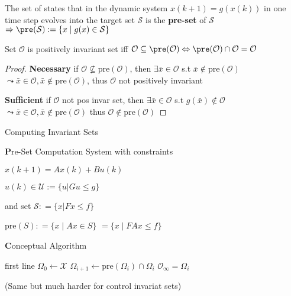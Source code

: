 \begin{definition}
	The set of states that
	in the dynamic system $x(k+1) = g(x(k))$
	in one time step evolves into the target set $\mathcal{S}$
	is the \textbf{pre-set} of $\mathcal{S}$
	$\Rightarrow \pre(\mathcal{S}) := \{x\mid g(x)\in \mathcal{S}\}$
\end{definition}
\begin{theorem}
	Set $\mathcal{O}$ is positively invariant set iff
	$\mathcal{O}\subseteq\pre(\mathcal{O})
		\Leftrightarrow
		\pre(\mathcal{O})\cap\mathcal{O} = \mathcal{O}$
\end{theorem}
\begin{proof}
	\textbf{Necessary} if
	$\mathcal{O} \nsubseteq  \mathrm{pre}(\mathcal{O})$,
	then $\exists\bar{x} \in \mathcal{O}$
	s.t $\bar{x} \notin \mathrm{pre}(\mathcal{O})$
	$\leadsto \bar{x}\in\mathcal{O},
		\bar{x}\notin\mathrm{pre}(\mathcal{O})$,
	thus $\mathcal{O}$ not positively invariant

	\textbf{Sufficient} if
	$\mathcal{O}$ not pos invar set,
	then $\exists \bar{x}\in\mathcal{O}$
	s.t $g(\bar{x}) \notin\mathcal{O}$
	$\leadsto \bar{x}\in\mathcal{O},
		\bar{x}\notin\mathrm{pre}(\mathcal{O})$
	thus $\mathcal{O}\notin \mathrm{pre}(\mathcal{O})$
\end{proof}


Computing Invariant Sets

\begin{minipage}[b]{0.495\linewidth}
	\begin{sstTitleBox}[ForestGreen]{\center\textbf
			Pre-Set Computation}
		System with constraints

		$x(k+1) = Ax(k) +Bu(k)$

		$u(k)\in\mathcal{U}:=\{u|Gu\le g\}$

		and set
		$\mathcal{S}: = \{x|Fx\leq f\}$

		$ 			\mathrm{pre}(S):  =  \{x \mid Ax \in S\}  $
		$ 			=  \{ x \mid FAx \leq f\}                 $
	\end{sstTitleBox}
\end{minipage}
\begin{minipage}[b]{0.49\linewidth}
	\begin{sstTitleBox}[ForestGreen]{\center\textbf
			Conceptual Algorithm}
		\begin{sstOnlyFrame}[ForestGreen]
			\begin{algorithmic}
				\State first line
				\State $\Omega_0 \leftarrow \mathcal{X}$
				\Loop
				\State $\Omega_{i+1} \leftarrow \mathrm{pre}(\Omega_i)\cap\Omega_i$
				\State\Return $\mathcal{O}_\infty = \Omega_i$
				\EndIf
				\EndLoop
			\end{algorithmic}
		\end{sstOnlyFrame}
		(Same but much harder for control invariat sets)
	\end{sstTitleBox}
\end{minipage}

